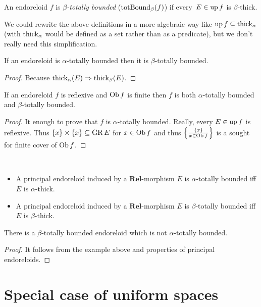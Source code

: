 \begin{defn}
An endoreloid $f$ is \emph{$\beta$-totally bounded} ($\operatorname{totBound}_{\beta}(f)$)
if every~$E\in\operatorname{up} f$ is $\beta$-thick.\end{defn}
\begin{rem}
We could rewrite the above definitions in a more algebraic way like
$\operatorname{up} f\subseteq\operatorname{thick}_{\alpha}$ (with $\operatorname{thick}_{\alpha}$ would be
defined as a set rather than as a predicate), but we don't really
need this simplification.\end{rem}
\begin{prop}
If an endoreloid is $\alpha$-totally bounded then it is $\beta$-totally
bounded.\end{prop}
\begin{proof}
Because $\operatorname{thick}_{\alpha}(E)\Rightarrow\operatorname{thick}_{\beta}(E)$.\end{proof}
\begin{prop}
If an endoreloid $f$ is reflexive and $\operatorname{Ob} f$ is finite then $f$
is both $\alpha$-totally bounded and $\beta$-totally bounded.\end{prop}
\begin{proof}
It enough to prove that $f$ is $\alpha$-totally bounded. Really,
every $E\in\operatorname{up} f$ is reflexive. Thus $\{x\}\times\{x\}\subseteq\operatorname{GR} E$
for $x\in\operatorname{Ob} f$ and thus $\left\{ \frac{\{x\}}{x\in\operatorname{Ob} f}\right\}$ is a sought
for finite cover of $\operatorname{Ob} f$.\end{proof}
\begin{obvious}
~
\begin{itemize}
\item A principal endoreloid induced by a $\mathbf{Rel}$-morphism $E$ is
$\alpha$-totally bounded iff $E$ is $\alpha$-thick.
\item A principal endoreloid induced by a $\mathbf{Rel}$-morphism $E$ is
$\beta$-totally bounded iff $E$ is $\beta$-thick.
\end{itemize}
\end{obvious}
\begin{example}
There is a $\beta$-totally bounded endoreloid which is not $\alpha$-totally
bounded.\end{example}
\begin{proof}
It follows from the example above and properties of principal endoreloids.
\end{proof}

\section{Special case of uniform spaces}

